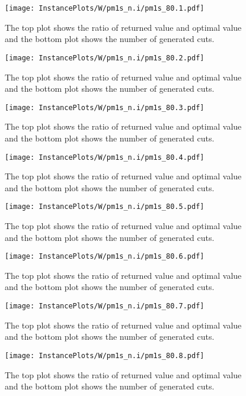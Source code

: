 \documentclass[10pt,a4paper]{article}
\begin{document}
\begin{figure}[H]
\texttt{[image: InstancePlots/W/pm1s\_n.i/pm1s\_80.1.pdf]}
\caption{The top plot shows the ratio of returned value and optimal value     and the bottom plot shows the number of generated cuts.}
\end{figure}

\begin{figure}[H]
\texttt{[image: InstancePlots/W/pm1s\_n.i/pm1s\_80.2.pdf]}
\caption{The top plot shows the ratio of returned value and optimal value     and the bottom plot shows the number of generated cuts.}
\end{figure}

\begin{figure}[H]
\texttt{[image: InstancePlots/W/pm1s\_n.i/pm1s\_80.3.pdf]}
\caption{The top plot shows the ratio of returned value and optimal value     and the bottom plot shows the number of generated cuts.}
\end{figure}

\begin{figure}[H]
\texttt{[image: InstancePlots/W/pm1s\_n.i/pm1s\_80.4.pdf]}
\caption{The top plot shows the ratio of returned value and optimal value     and the bottom plot shows the number of generated cuts.}
\end{figure}

\begin{figure}[H]
\texttt{[image: InstancePlots/W/pm1s\_n.i/pm1s\_80.5.pdf]}
\caption{The top plot shows the ratio of returned value and optimal value     and the bottom plot shows the number of generated cuts.}
\end{figure}

\begin{figure}[H]
\texttt{[image: InstancePlots/W/pm1s\_n.i/pm1s\_80.6.pdf]}
\caption{The top plot shows the ratio of returned value and optimal value     and the bottom plot shows the number of generated cuts.}
\end{figure}

\begin{figure}[H]
\texttt{[image: InstancePlots/W/pm1s\_n.i/pm1s\_80.7.pdf]}
\caption{The top plot shows the ratio of returned value and optimal value     and the bottom plot shows the number of generated cuts.}
\end{figure}

\begin{figure}[H]
\texttt{[image: InstancePlots/W/pm1s\_n.i/pm1s\_80.8.pdf]}
\caption{The top plot shows the ratio of returned value and optimal value     and the bottom plot shows the number of generated cuts.}
\end{figure}
\end{document}
